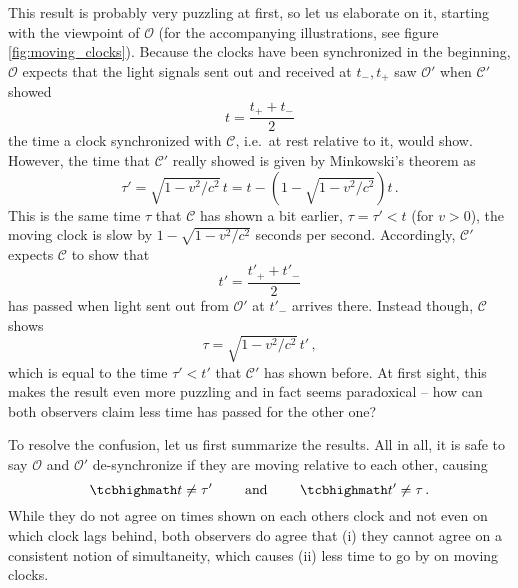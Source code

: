 This result is probably very puzzling at first, so let us elaborate on it, starting with the viewpoint of $\mathcal{O}$ (for the accompanying illustrations, see figure \ref{fig:moving_clocks}). Because the clocks have been synchronized in the beginning, $\mathcal{O}$ expects that the light signals sent out and received at $t_-, t_+$ saw $\mathcal{O}'$ when $\mathcal{C}'$ showed
\begin{equation*}
	t = \frac{t_+ + t_-}{2}
\end{equation*}
the time a clock synchronized with $\mathcal{C}$, i.e.~at rest relative to it, would show. However, the time that $\mathcal{C}'$ really showed is given by Minkowski's theorem as
\begin{equation*}
	\tau' = \sqrt{1 - v^2 / c^2} \, t = t - (1 - \sqrt{1 - v^2 / c^2}) t \, .
\end{equation*}
This is the same time $\tau$ that $\mathcal{C}$ has shown a bit earlier, $\tau = \tau' < t$ (for $v > 0$), the moving clock is slow by $1 - \sqrt{1 - v^2 / c^2}$ seconds per second. Accordingly, $\mathcal{C}'$ expects $\mathcal{C}$ to show that
\begin{equation*}
	t' = \frac{t'_+ + t'_-}{2}
\end{equation*}
has passed when light sent out from $\mathcal{O}'$ at $t'_-$ arrives there. Instead though, $\mathcal{C}$ shows
\begin{equation*}
	\tau = \sqrt{1 - v^2 / c^2} \, t' \, ,
\end{equation*}
which is equal to the time $\tau' < t'$ that $\mathcal{C}'$ has shown before. At first sight, this makes the result even more puzzling and in fact seems paradoxical -- how can both observers claim less time has passed for the other one?

To resolve the confusion, let us first summarize the results. All in all, it is safe to say $\mathcal{O}$ and $\mathcal{O}'$ de-synchronize if they are moving relative to each other, causing
\begin{equation}
	\eqbox{
	t \neq \tau'
	}
	\qquad \text{ and } \qquad
	\eqbox{
	t' \neq \tau
	} \, .
\end{equation}
While they do not agree on times shown on each others clock and not even on which clock lags behind, both observers do agree that (i) they cannot agree on a consistent notion of simultaneity, which causes (ii) less time to go by on moving clocks.


